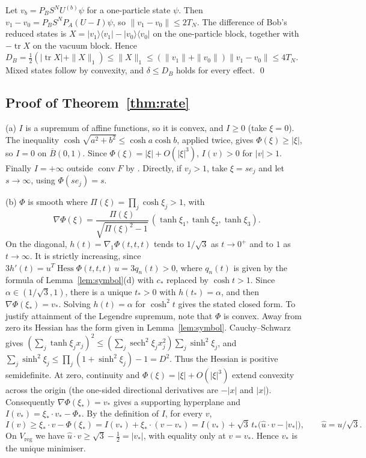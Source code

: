 \documentclass[11pt]{amsart}
\theoremstyle{definition}
\theoremstyle{remark}
\newcommand{\tr}{\operatorname{tr}}
\newcommand{\Hess}{\operatorname{Hess}}
\newcommand{\uhat}{\hat u}
\begin{document}
Let $v_b=P_BS^NU^{(b)}\psi$ for a one-particle state $\psi$.  Then
$v_1-v_0=P_BS^NP_A(U-I)\psi$, so $\|v_1-v_0\|\le2T_N$.  The difference of
Bob's reduced states is $X=|v_1\rangle\langle v_1|-|v_0\rangle\langle v_0|$ on
the one-particle block, together with $-\tr X$ on the vacuum block.  Hence
$D_B=\frac12(|\tr X|+\|X\|_1)\le\|X\|_1\le(\|v_1\|+\|v_0\|)\|v_1-v_0\|\le4T_N$.
Mixed states follow by convexity, and $\delta\le D_B$ holds for every effect.
\qed

\subsection{Proof of Theorem~\ref{thm:rate}}
(a) $I$ is a supremum of affine functions, so it is convex, and $I\ge0$
(take $\xi=0$).  The inequality
$\cosh\sqrt{a^2+b^2}\le\cosh a\cosh b$, applied twice, gives
$\Phi(\xi)\ge|\xi|$, so $I=0$ on $\overline B(0,1)$.  Since
$\Phi(\xi)=|\xi|+O(|\xi|^3)$, $I(v)>0$ for $|v|>1$.  Finally $I=+\infty$ outside
$\operatorname{conv}F$ by \cite[Lemma~4.1]{CJWW}.  Directly, if
$v_j>1$, take $\xi=se_j$ and let $s\to\infty$, using $\Phi(se_j)=s$.

(b) $\Phi$ is smooth where $\Pi(\xi)=\prod_j\cosh\xi_j>1$, with
\[
\nabla\Phi(\xi)=\frac{\Pi(\xi)}{\sqrt{\Pi(\xi)^2-1}}\,(\tanh\xi_1,\tanh\xi_2,\tanh\xi_3).
\]
On the diagonal, $h(t)=\nabla_1\Phi(t,t,t)$ tends to $1/\sqrt3$ as
$t\to0^+$ and to $1$ as $t\to\infty$.  It is strictly increasing, since
$3h'(t)=u^T\Hess\Phi(t,t,t)\,u=3q_n(t)>0$, where $q_n(t)$ is given by the
formula of Lemma~\ref{lem:symbol}(d) with $c_*$ replaced by $\cosh t>1$.  Since
$\alpha\in(1/\sqrt3,1)$, there is a unique $t_*>0$ with $h(t_*)=\alpha$, and
then $\nabla\Phi(\xi_*)=v_*$.  Solving $h(t)=\alpha$ for $\cosh^2t$ gives the
stated closed form. To justify attainment of the Legendre supremum, note
that $\Phi$ is convex. Away from zero its Hessian has the form given in
Lemma~\ref{lem:symbol}. Cauchy--Schwarz gives
$(\sum_j\tanh\xi_j x_j)^2\le
(\sum_j\operatorname{sech}^2\xi_j x_j^2)\sum_j\sinh^2\xi_j$,
and $\sum_j\sinh^2\xi_j\le\prod_j(1+\sinh^2\xi_j)-1=D^2$.
Thus the Hessian is positive semidefinite. At zero, continuity and
$\Phi(\xi)=|\xi|+O(|\xi|^3)$ extend convexity across the origin
(the one-sided directional derivatives are $-|x|$ and $|x|$).
Consequently $\nabla\Phi(\xi_*)=v_*$ gives a supporting hyperplane and
$I(v_*)=\xi_*\cdot v_*-\Phi_*$. By the definition of $I$, for every $v$,
\[
I(v)\ge\xi_*\cdot v-\Phi(\xi_*)=I(v_*)+\xi_*\cdot(v-v_*)
=I(v_*)+\sqrt3\,t_*\bigl(\uhat\cdot v-|v_*|\bigr),
\qquad \uhat=u/\sqrt3 .
\]
On $V_{\mathrm{reg}}$ we have $\uhat\cdot v\ge\sqrt3-\frac12=|v_*|$, with
equality only at $v=v_*$.  Hence $v_*$ is the unique minimiser.
\end{document}
